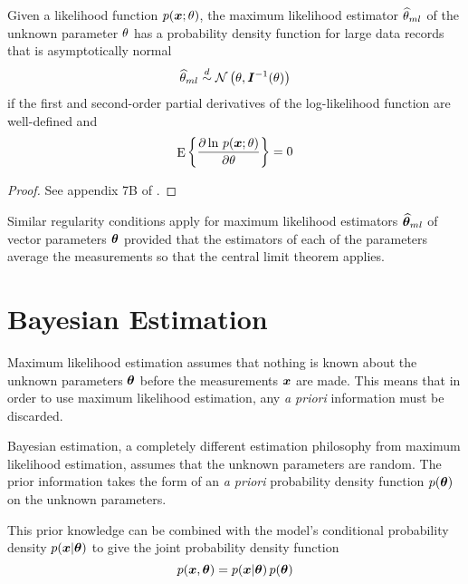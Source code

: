 \begin{theorem}
\label{mp thm:normality}
Given a likelihood function $p(\bm{x};\theta)$, the maximum likelihood 
estimator $\widehat{\theta}_{ml}$ of the unknown parameter $\theta$ has a probability density
function for large data records that is asymptotically normal 
\begin{equation}
\widehat{\theta}_{ml}\stackrel{d}{\sim}{\cal N}\left(\theta,\bm{I}^{-1}(\theta)\right)
\end{equation}
if the first and second-order partial derivatives of the log-likelihood
function are well-defined and
\begin{equation}
{\mathop{\rm E}\nolimits\left\{\frac{{\partial}\ln\,p(\bm{x};\theta)}{{\partial}\theta}\right\}}=0
\end{equation}
\end{theorem}

\begin{proof}
See appendix 7B of \cite{Kay93}.
\end{proof}

Similar regularity conditions apply for maximum likelihood estimators
$\widehat{\bm{\theta}}_{ml}$ of vector parameters $\bm{\theta}$ provided that the estimators of each of
the parameters average the measurements so that the central limit theorem
applies.

\section{Bayesian Estimation}


Maximum likelihood estimation assumes that nothing is known about the
unknown parameters $\bm{\theta}$ before the measurements $\bm{x}$ are made.  This
means that in order to use maximum likelihood estimation, any {\em a priori\/}
information must be discarded.

Bayesian estimation, a completely different estimation philosophy from maximum
likelihood estimation, assumes that the unknown parameters are random.  The
prior information takes the form of an {\em a priori\/} probability density
function $p(\bm{\theta})$ on the unknown parameters.

This prior knowledge can be combined with the model's conditional
probability density $p(\bm{x}|\bm{\theta})$ to give the joint probability density
function
\begin{equation}
p(\bm{x},\bm{\theta})=p(\bm{x}|\bm{\theta})\,p(\bm{\theta})
\end{equation}

